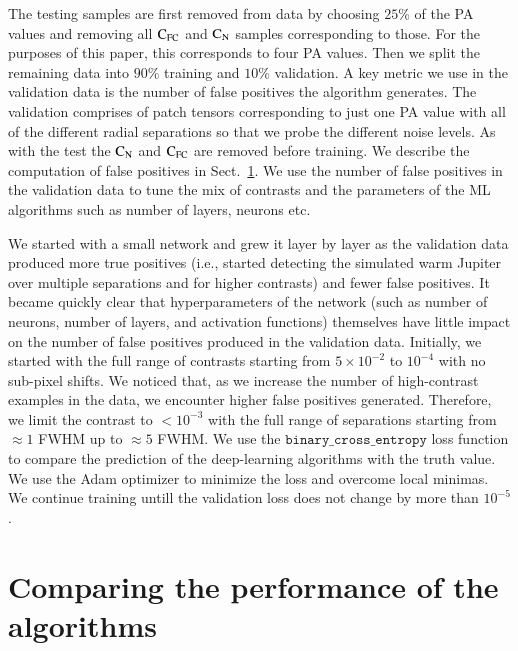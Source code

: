 \documentclass{aa}
\begin{document}
The testing samples are first removed from data by choosing $25\%$ of the PA values and removing all $\rm{C_{FC}}$ and $\rm{C_N}$ samples corresponding to those. 
For the purposes of this paper, this corresponds to four PA values.
Then we split the remaining data into $90\%$ training and $10\%$ validation.
A key metric we use in the validation data is the number of false positives the algorithm generates. 
The validation comprises of patch tensors corresponding to just one PA value with all of the different radial separations so that we probe the different noise levels.
As with the test the $\rm{C_N}$ and $\rm{C_{FC}}$ are removed before training.
We describe the computation of false positives in Sect.~\ref{sec:results}.
We use the number of false positives in the validation data to tune the mix of contrasts and the parameters of the ML algorithms such as number of layers, neurons etc.

We started with a small network and grew it layer by layer as the validation data produced more true positives (i.e., started detecting the simulated warm Jupiter over multiple separations and for higher contrasts) and fewer false positives.
It became quickly clear that hyperparameters of the network (such as number of neurons, number of layers, and activation functions) themselves have little impact on the number of false positives produced in the validation data.
Initially, we started with the full range of contrasts starting from $5\times10^{-2}$ to $10^{-4}$ with no sub-pixel shifts.
We noticed that, as we increase the number of high-contrast examples in the data, we encounter higher false positives generated. Therefore, we limit the contrast to $<10^{-3}$ with the full range of separations starting from $\approx 1$ FWHM up to $\approx 5$ FWHM.
We use the $\texttt{binary\_cross\_entropy}$ loss function \citep{1993Li} to compare the prediction of the deep-learning algorithms with the truth value.
We use the Adam optimizer \citep{2014Adam} to minimize the loss and overcome local minimas.
We continue training untill the validation loss does not change by more than $10^{-5}$.



\section{Comparing the performance of the algorithms}\label{sec:results}
\end{document}
